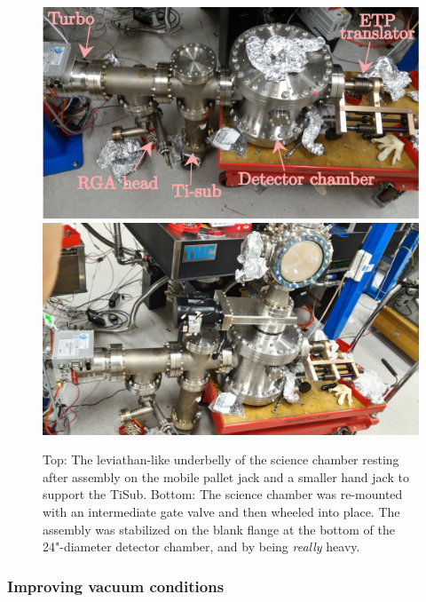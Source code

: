 	\begin{figure}
			\centering
		\includegraphics[width=\textwidth]{fig/lattice/detector_level.eps} %
		\includegraphics[width=\textwidth]{fig/lattice/full_assembly_20160915} %
			\caption{Top: The leviathan-like underbelly of the science chamber resting after assembly on the mobile pallet jack and a smaller hand jack to support the TiSub.
		 Bottom: The science chamber was re-mounted with an intermediate gate valve and then wheeled into place.
		The assembly was stabilized on the blank flange at the bottom of the {24"}-diameter detector chamber, and by being \emph{really} heavy.}
	\label{fig:underbelly}
	\end{figure}

	


	
	\subsubsection{Improving vacuum conditions}

